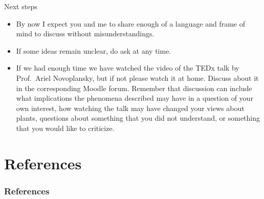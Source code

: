 \documentclass[10pt]{beamer}
\begin{document}
\begin{frame}{Next steps \Discussion}
\begin{itemize}
  \item By now I expect you and me to share enough of a language and frame of mind to discuss without misunderstandings.
  \item If some ideas remain unclear, do ask at any time.
  \item If we had enough time we have watched the video of the TEDx talk by Prof.\ Ariel Novoplansky, but if not please watch it at home. Discuss about it in the corresponding Moodle forum. Remember that discussion can include what implications the phenomena described may have in a question of your own interest, how watching the talk may have changed your views about plants, questions about something that you did not understand, or something that you would like to criticize.
\end{itemize}

\end{frame}

\section*{References}
  \nocite{Ballare2009}
  \begin{frame}[t,allowframebreaks]
    \frametitle{References}
    \printbibliography
  \end{frame}
\end{document}
